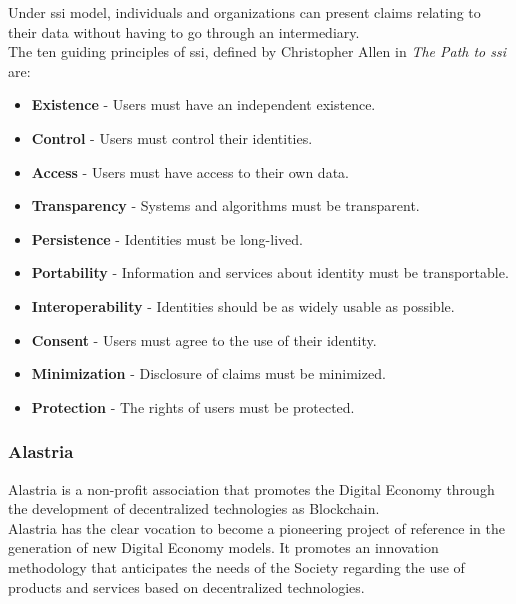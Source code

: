 \documentclass[a4paper, 12pt]{article} %
\begin{document}
            Under \acrlong{ssi} model, individuals and organizations can present claims relating to their data without having to go through an intermediary.\\
            
            The ten guiding principles of \acrshort{ssi}, defined by Christopher Allen in \textit{The Path to \acrlong{ssi}}\cite{path-to-ssi} are:
            \begin{itemize}
                \item \textbf{Existence} - Users must have an independent existence.
                \item \textbf{Control} - Users must control their identities.
                \item \textbf{Access} - Users must have access to their own data.
                \item \textbf{Transparency} - Systems and algorithms must be transparent.
                \item \textbf{Persistence} - Identities must be long-lived.
                \item \textbf{Portability} - Information and services about identity must be transportable.
                \item \textbf{Interoperability} - Identities should be as widely usable as possible.
                \item \textbf{Consent} - Users must agree to the use of their identity.
                \item \textbf{Minimization} - Disclosure of claims must be minimized.
                \item \textbf{Protection} - The rights of users must be protected.
            \end{itemize}
            
        \subsubsection{Alastria}
        Alastria is a non-profit association that promotes the Digital Economy through the development of decentralized technologies as Blockchain.\\
        
        Alastria has the clear vocation to become a pioneering project of reference in the generation of new Digital Economy models. It promotes an innovation methodology that anticipates the needs of the Society regarding the use of products and services based on decentralized technologies.\\
        
\end{document}
